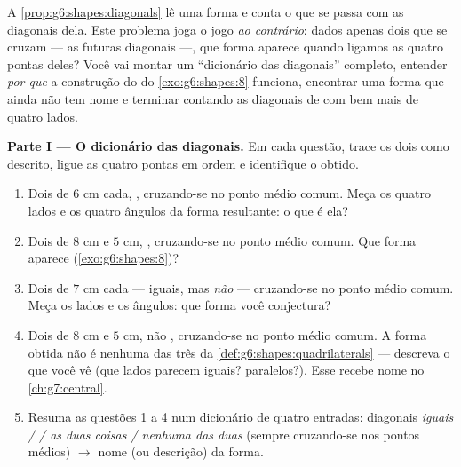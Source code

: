 \begin{problem}
\label{pb:g6:shapes:1}
A \cref{prop:g6:shapes:diagonals} lê uma forma e conta o que se passa
com as diagonais dela. Este problema joga o jogo \emph{ao contrário}:
dados apenas dois  que se cruzam --- as futuras diagonais ---,
que forma aparece quando ligamos as quatro pontas deles? Você vai
montar um ``dicionário das diagonais'' completo, entender \emph{por
que} a construção do  do \cref{exo:g6:shapes:8} funciona,
encontrar uma forma que ainda não tem nome e terminar contando as
diagonais de  com bem mais de quatro lados.

\medskip
\noindent\textbf{Parte I --- O dicionário das diagonais.}
Em cada questão, trace os dois  como descrito, ligue as quatro
pontas em ordem e identifique o  obtido.
\begin{enumerate}
  \item Dois  de $6$ cm cada, , cruzando-se no
        ponto médio comum. Meça os quatro lados e os quatro ângulos da
        forma resultante: o que é ela?
  \item Dois  de $8$ cm e $5$ cm, ,
        cruzando-se no ponto médio comum. Que forma aparece
        (\cref{exo:g6:shapes:8})?
  \item Dois  de $7$ cm cada --- iguais, mas \emph{não}
         --- cruzando-se no ponto médio comum. Meça os
        lados e os ângulos: que forma você conjectura?
  \item Dois  de $8$ cm e $5$ cm, não ,
        cruzando-se no ponto médio comum. A forma obtida não é nenhuma
        das três da \cref{def:g6:shapes:quadrilaterals} --- descreva o
        que você vê (que lados parecem iguais? paralelos?). Esse
         recebe nome no \cref{ch:g7:central}.
  \item Resuma as questões 1 a 4 num dicionário de quatro entradas:
        diagonais \emph{iguais /  / as duas coisas /
        nenhuma das duas} (sempre cruzando-se nos pontos médios)
        $\rightarrow$ nome (ou descrição) da forma.
\end{enumerate}


\end{problem}
